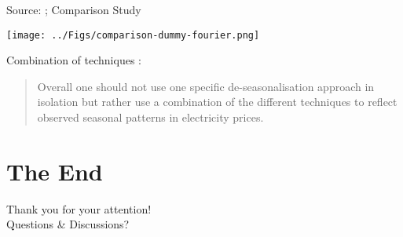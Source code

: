 \documentclass{beamer}
\begin{document}
\begin{frame}{Source: \cite{Saethero-2017}; Comparison Study}
    \begin{center}
        \texttt{[image: ../Figs/comparison-dummy-fourier.png]}
    \end{center}
\end{frame}


\begin{frame}{Combination of techniques}
    \cite{Saethero-2017}:

    \begin{quote}
        Overall one should not use one specific de-seasonalisation approach in isolation but rather use a combination of the different techniques to reflect observed seasonal patterns in electricity prices.
    \end{quote}
\end{frame}


\section{The End}

\begin{frame}
    \centering
    \Huge
    Thank you for your attention! \\[0.5cm] Questions \& Discussions?
\end{frame}

\nocite{*}

\end{document}
